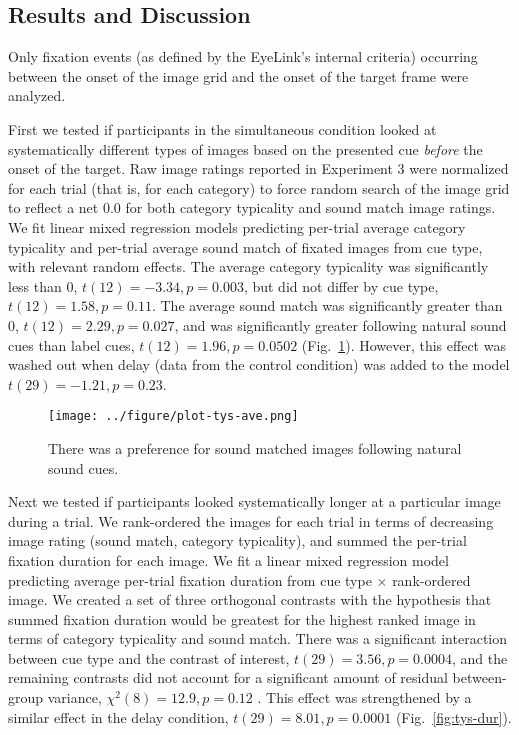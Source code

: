 \documentclass[12pt, titlepage]{article}
\begin{document}
\subsection{Results and Discussion}
Only fixation events (as defined by the EyeLink's internal criteria) occurring between the onset of the image grid and the onset of the target frame were analyzed. 

First we tested if participants in the simultaneous condition looked at systematically different types of images based on the presented cue \textit{before} the onset of the target. Raw image ratings reported in Experiment 3 were normalized for each trial (that is, for each category) to force random search of the image grid to reflect a net 0.0 for both category typicality and sound match image ratings. We fit linear mixed regression models predicting per-trial average category typicality and per-trial average sound match of fixated images from cue type, with relevant random effects. The average category typicality was significantly less than 0, $t(12)=-3.34, p=0.003$, but did not differ by cue type, $t(12)=1.58, p=0.11$. The average sound match was significantly greater than 0, $t(12)=2.29, p=0.027$, and was significantly greater following natural sound cues than label cues, $t(12)=1.96, p=0.0502$ (Fig.~\ref{fig:tys-ratings}). However, this effect was washed out when delay (data from the control condition) was added to the model $t(29)=-1.21, p=0.23$.

\begin{figure}[h!]
	\centering
	\caption{There was a preference for sound matched images following natural sound cues.}
	\label{fig:tys-ratings}
	\texttt{[image: ../figure/plot-tys-ave.png]}
\end{figure}

Next we tested if participants looked systematically longer at a particular image during a trial. We rank-ordered the images for each trial in terms of decreasing image rating (sound match, category typicality), and summed the per-trial fixation duration for each image. We fit a linear mixed regression model predicting average per-trial fixation duration from cue type $\times$ rank-ordered image. We created a set of three orthogonal contrasts with the hypothesis that summed fixation duration would be greatest for the highest ranked image in terms of category typicality and sound match. There was a significant interaction between cue type and the contrast of interest, $t(29)=3.56, p=0.0004$, and the remaining contrasts did not account for a significant amount of residual between-group variance, $\chi^2(8)=12.9, p=0.12$ \cite{Abelson:1997vx}. This effect was strengthened by a similar effect in the delay condition, $t(29)=8.01, p=0.0001$ (Fig.~\ref{fig:tys-dur}).
\end{document}
